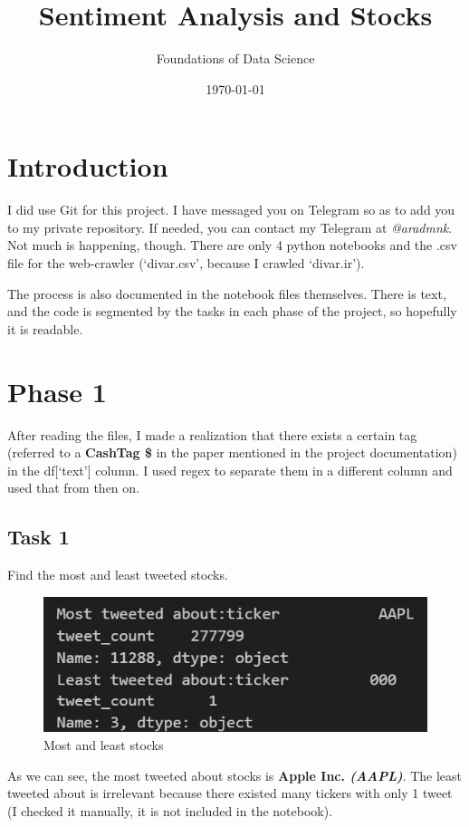 \documentclass[12pt]{article}
\title{Sentiment Analysis and Stocks}
\subtitle{Foundations of Data Science}
\date{\today}
\begin{document}
\maketitlepage
\maketitlestart

\section{Introduction}
I did use Git for this project. I have messaged you on Telegram
so as to add you to my private repository. If needed, you can
contact my Telegram at \textit{@aradmnk}. Not much is happening, though.
There are only 4 python notebooks and the .csv file for the web-crawler
(`divar.csv', because I crawled `divar.ir').

The process is also documented in the notebook files themselves. 
There is text, and the code is segmented by the tasks in each 
phase of the project, so hopefully it is readable.

\pagebreak

\section{Phase 1}
After reading the files, I made a realization that there exists a
certain tag (referred to a \textbf{CashTag \$} in the paper mentioned
in the project documentation) in the df[`text'] column. I used regex
to separate them in a different column and used that from then on.

\subsection{Task 1}

\begin{qsolve}[Task]
    Find the most and least tweeted stocks.
\end{qsolve}

\begin{figure}[h!]
    \centering
    \includegraphics[width=.7\textwidth]{P1.1.jpg}
    \caption{Most and least stocks}
    \label{fig:1.1}
\end{figure}

As we can see, the most tweeted about stocks is \textbf{Apple Inc. \textit{(AAPL)}}.
The least tweeted about is irrelevant because there existed many tickers with
only 1 tweet (I checked it manually, it is not included in the notebook).
\end{document}
